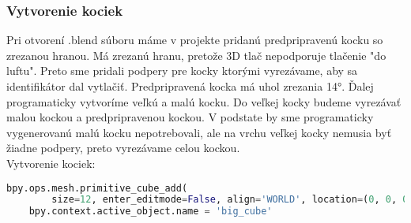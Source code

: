\subsubsection{Vytvorenie kociek}
Pri otvorení .blend súboru máme v projekte pridanú predpripravenú kocku so zrezanou hranou. Má zrezanú hranu, pretože 3D tlač nepodporuje tlačenie "do luftu". Preto sme pridali podpery pre kocky ktorými vyrezávame, aby sa identifikátor dal vytlačiť. Predpripravená kocka má uhol zrezania 14°. Ďalej programaticky vytvoríme veľkú a malú kocku. Do veľkej kocky budeme vyrezávať malou kockou a predpripravenou kockou. V podstate by sme programaticky vygenerovanú malú kocku nepotrebovali, ale na vrchu veľkej kocky nemusia byť žiadne podpery, preto vyrezávame celou kockou. \\Vytvorenie kociek: 
\begin{lstlisting}[language=Python]
    bpy.ops.mesh.primitive_cube_add(
        size=12, enter_editmode=False, align='WORLD', location=(0, 0, 0))
    bpy.context.active_object.name = 'big_cube'
\end{lstlisting}